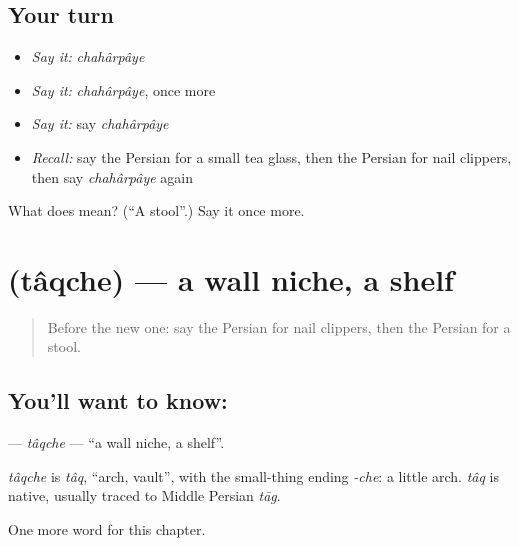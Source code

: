 \subsection*{Your turn}
\begin{itemize}
\raggedright
  \item \emph{Say it:} \emph{chahârpâye}
  \item \emph{Say it:} \emph{chahârpâye}, once more
  \item \emph{Say it:} say \emph{chahârpâye}
  \item \emph{Recall:} say the Persian for a small tea glass, then the Persian for nail clippers, then say \emph{chahârpâye} again
\end{itemize}

\begin{tcolorbox}[breakable,colback=teal!4,colframe=teal!35!black,title={Before you move on}]
What does  mean? (\textquotedblleft{}A stool\textquotedblright{}.) Say it once more.
\end{tcolorbox}
\section[\texorpdfstring{\fa{طاقچه} (tâqche)}{طاقچه (tâqche)}]{ (tâqche) — a wall niche, a shelf}

\label{lesson:FA-C213-taqche}



\begin{quote}
Before the new one: say the Persian for nail clippers, then the Persian for a stool.
\end{quote}

\subsection*{You'll want to know: }
\textbf{} — \emph{tâqche} — \textquotedblleft{}a wall niche, a shelf\textquotedblright{}.

\begin{cousinweb}
\emph{tâqche} is \emph{tâq}, \textquotedblleft{}arch, vault\textquotedblright{}, with the small-thing ending \emph{-che}: a little arch. \emph{tâq} is native, usually traced to Middle Persian \emph{tāg}.
\end{cousinweb}

\begin{grammarlens}[title={What you've built}]
One more word for this chapter.
\end{grammarlens}

